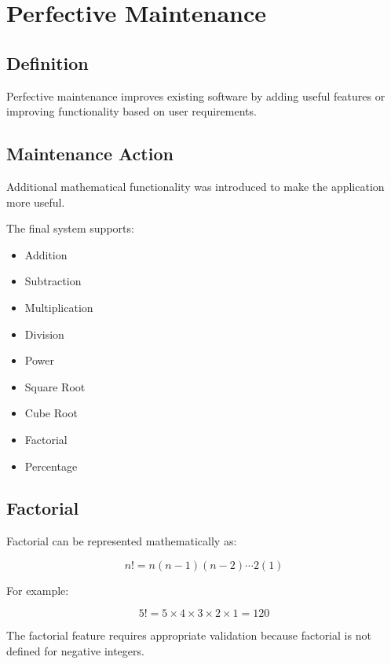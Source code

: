 \documentclass[12pt,a4paper]{report}
\begin{document}

\chapter{Perfective Maintenance}

\section{Definition}

Perfective maintenance improves existing software by adding useful
features or improving functionality based on user requirements.

\section{Maintenance Action}

Additional mathematical functionality was introduced to make the
application more useful.

The final system supports:

\begin{itemize}
    \item Addition
    \item Subtraction
    \item Multiplication
    \item Division
    \item Power
    \item Square Root
    \item Cube Root
    \item Factorial
    \item Percentage
\end{itemize}

\section{Factorial}

Factorial can be represented mathematically as:

\[
n! = n(n-1)(n-2)\cdots 2(1)
\]

For example:

\[
5! = 5 \times 4 \times 3 \times 2 \times 1 = 120
\]

The factorial feature requires appropriate validation because
factorial is not defined for negative integers.
\end{document}
